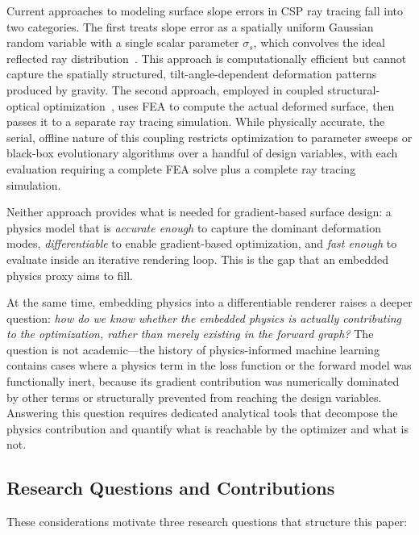 \documentclass{CVM}
\begin{document}
Current approaches to modeling surface slope errors in CSP ray tracing fall
into two categories. The first treats slope error as a spatially uniform
Gaussian random variable with a single scalar parameter $\sigma_s$, which
convolves the ideal reflected ray distribution~\cite{hflcal,soltrace}. This
approach is computationally efficient but cannot capture the spatially
structured, tilt-angle-dependent deformation patterns produced by gravity. The
second approach, employed in coupled structural-optical
optimization~\cite{yan2024,yan2025,yang2022,thalange2017}, uses FEA to compute
the actual deformed surface, then passes it to a separate ray tracing
simulation. While physically accurate, the serial, offline nature of this
coupling restricts optimization to parameter sweeps or black-box evolutionary
algorithms over a handful of design variables, with each evaluation requiring a
complete FEA solve plus a complete ray tracing simulation.

Neither approach provides what is needed for gradient-based surface design: a
physics model that is \emph{accurate enough} to capture the dominant
deformation modes, \emph{differentiable} to enable gradient-based optimization,
and \emph{fast enough} to evaluate inside an iterative rendering loop. This is
the gap that an embedded physics proxy aims to fill.

At the same time, embedding physics into a differentiable renderer raises a
deeper question: \emph{how do we know whether the embedded physics is actually
contributing to the optimization, rather than merely existing in the forward
graph?} The question is not academic---the history of physics-informed machine
learning contains cases where a physics term in the loss function or the
forward model was functionally inert, because its gradient contribution was
numerically dominated by other terms or structurally prevented from reaching
the design variables. Answering this question requires dedicated analytical
tools that decompose the physics contribution and quantify what is reachable by
the optimizer and what is not.

\subsection{Research Questions and Contributions}

These considerations motivate three research questions that structure this paper:
\end{document}
